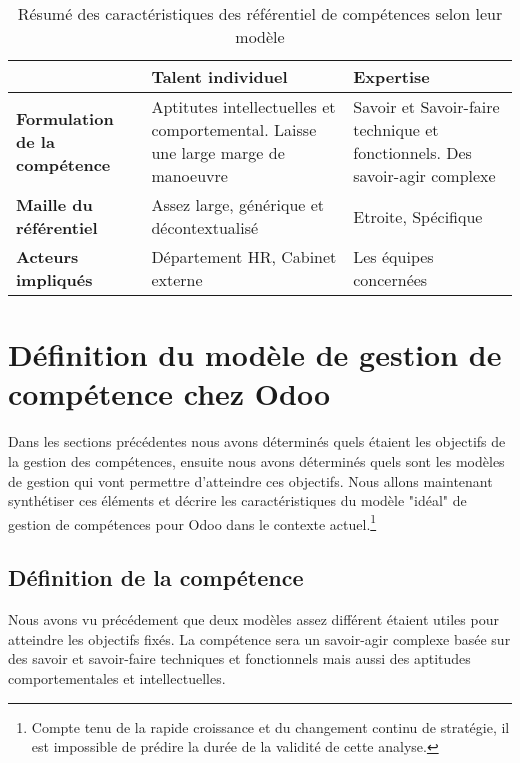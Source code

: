 \begin{table}[H]
  \caption{Résumé des caractéristiques des référentiel de compétences selon leur modèle}
  \label{model_comp}

  \begin{center}
    \begin{tabular}{p{}p{}p{}}
      & \textbf{Talent individuel} & \textbf{Expertise} \\
      \hline
      \textbf{Formulation de la compétence} & Aptitutes intellectuelles et comportemental. Laisse une large marge de manoeuvre & Savoir et Savoir-faire technique et fonctionnels. Des savoir-agir complexe\\
      \textbf{Maille du référentiel} & Assez large, générique et décontextualisé & Etroite, Spécifique\\
      \textbf{Acteurs impliqués}  & Département HR, Cabinet externe &  Les équipes concernées\\
  
    \end{tabular}
  \end{center}
\end{table}

\section{Définition du modèle de gestion de compétence chez Odoo}
Dans les sections précédentes nous avons déterminés quels étaient les objectifs de la gestion des compétences, ensuite nous avons déterminés quels sont les modèles de gestion qui vont permettre d'atteindre ces objectifs. Nous allons maintenant synthétiser ces éléments et décrire les caractéristiques du modèle "idéal" de gestion de compétences pour Odoo dans le contexte actuel.\footnote{Compte tenu de la rapide croissance et du changement continu de stratégie, il est impossible de prédire la durée de la validité de cette analyse.} 

\subsection{Définition de la compétence}
Nous avons vu précédement que deux modèles assez différent étaient utiles pour atteindre les objectifs fixés. La compétence sera un savoir-agir complexe basée sur des savoir et savoir-faire techniques et fonctionnels mais aussi des aptitudes comportementales et intellectuelles. 

